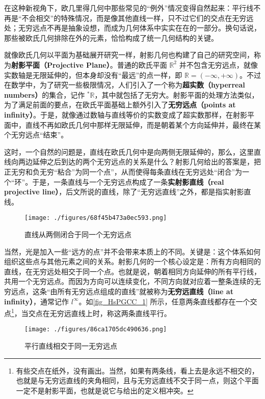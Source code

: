 在这种新视角下，欧几里得几何中那些常见的“例外”情况变得自然起来：平行线不再是“不会相交”的特殊情况，而是像其他直线一样，只不过它们的交点在无穷远处；无穷远点不再是抽象设想，而成为几何体系中实实在在的一部分。换句话说，那些被欧氏几何排除在外的元素，恰恰构成了统一几何结构的关键。

就像欧氏几何以平面为基础展开研究一样，射影几何也构建了自己的研究空间，称为\textbf{射影平面（Projective Plane）}。普通的欧氏平面 $\mathbb{R}^2$ 并不包含无穷远点，就像实数轴是无限延伸的，但本身却没有“最远”的点一样，即 $\mathbb{R} = (-\infty, +\infty)$。不过在数学中，为了研究一些极限情况，人们引入了一个称为\textbf{超实数（hyperreal numbers）}的集合，记作 $^*\mathbb{R}$，其中就包括了无穷大。射影平面的处理方法类似，为了满足前面的要点，在欧氏平面基础上额外引入了\textbf{无穷远点（points at infinity）}。于是，就像通过数轴与直线等价的实数变成了超实数那样，在射影平面中，直线不再如欧氏几何中那样无限延伸，而是朝着某个方向延伸并，最终在某个无穷远点“结束”。

这时，一个自然的问题是，直线在欧氏几何中是向两侧无限延伸的，那么，这里直线向两边延伸之后到达的两个无穷远点的关系是什么？射影几何给出的答案是，把正无穷和负无穷“粘合”为同一个点”，从而使得每条直线在无穷远处“闭合”为一个“环”。于是，一条直线与一个无穷远点构成了一条\textbf{实射影直线（real projective line）}，后文所说的直线，除了“无穷远直线”之外，都是指实射影直线。

\begin{figure}[ht]
\centering
\texttt{[image: ./figures/68f45b473a0ec593.png]}
\caption{直线从两侧闭合于同一个无穷远点} \label{fig_HsPGCC_2}
\end{figure}

当然，光是加入一些“远方的点”并不会带来本质上的不同。关键是：这个体系如何组织这些点与其他元素之间的关系。射影几何的一个核心设定是：所有方向相同的直线，在无穷远处相交于同一个点。也就是说，朝着相同方向延伸的所有平行线，共用一个无穷远点。而因为方向可以连续变化，不同方向就对应着一整条连续的无穷远点，这条“由所有无穷远点组成的直线”就被称为\textbf{无穷远直线（line at infinity）}，通常记作 $l^\infty$。如\autoref{fig_HsPGCC_1} 所示，任意两条直线都存在一个交点\footnote{有些交点在纸外，没有画出。当然，如果有两条线，看上去是永远不相交的，也就是与无穷远直线的夹角相同，且与无穷远直线不交于同一点，则这个平面一定不是射影平面，也就是说它与给出的定义相冲突。}，当交点在无穷远直线上时，称这两条直线平行。

\begin{figure}[ht]
\centering
\texttt{[image: ./figures/86ca1705dc490636.png]}
\caption{平行直线相交于同一无穷远点} \label{fig_HsPGCC_1}
\end{figure}

